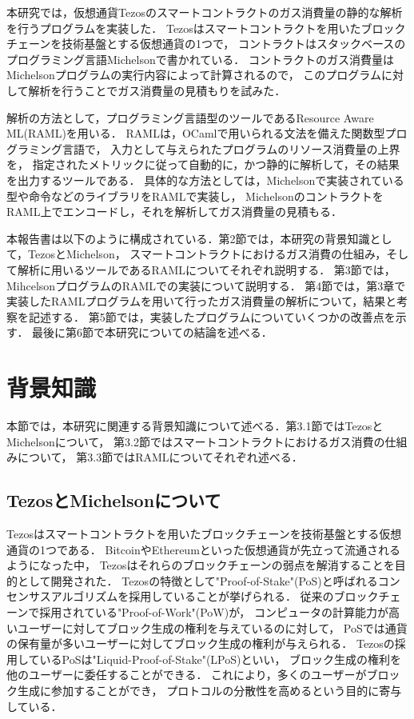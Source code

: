 \documentclass{kuisthesis}
\begin{document}
本研究では，仮想通貨Tezosのスマートコントラクトのガス消費量の静的な解析を行うプログラムを実装した．
Tezosはスマートコントラクトを用いたブロックチェーンを技術基盤とする仮想通貨の1つで，
コントラクトはスタックベースのプログラミング言語Michelsonで書かれている．
コントラクトのガス消費量はMichelsonプログラムの実行内容によって計算されるので，
このプログラムに対して解析を行うことでガス消費量の見積もりを試みた．

解析の方法として，プログラミング言語型のツールであるResource Aware ML(RAML)を用いる．
RAMLは，OCamlで用いられる文法を備えた関数型プログラミング言語で，
入力として与えられたプログラムのリソース消費量の上界を，
指定されたメトリックに従って自動的に，かつ静的に解析して，その結果を出力するツールである．
具体的な方法としては，Michelsonで実装されている型や命令などのライブラリをRAMLで実装し，
MichelsonのコントラクトをRAML上でエンコードし，それを解析してガス消費量の見積もる．

本報告書は以下のように構成されている．第2節では，本研究の背景知識として，TezosとMichelson，
スマートコントラクトにおけるガス消費の仕組み，そして解析に用いるツールであるRAMLについてそれぞれ説明する．
第3節では，MihcelsonプログラムのRAMLでの実装について説明する．
第4節では，第3章で実装したRAMLプログラムを用いて行ったガス消費量の解析について，結果と考察を記述する．
第5節では，実装したプログラムについていくつかの改善点を示す．
最後に第6節で本研究についての結論を述べる．


\section{背景知識}\label{sec-preliminary}
本節では，本研究に関連する背景知識について述べる．第3.1節ではTezosとMichelsonについて，
第3.2節ではスマートコントラクトにおけるガス消費の仕組みについて，
第3.3節ではRAMLについてそれぞれ述べる．

\subsection{TezosとMichelsonについて}\label{subsec-pre-tezos}
Tezosはスマートコントラクトを用いたブロックチェーンを技術基盤とする仮想通貨の1つである．
BitcoinやEthereumといった仮想通貨が先立って流通されるようになった中，
Tezosはそれらのブロックチェーンの弱点を解消することを目的として開発された．
Tezosの特徴として"Proof-of-Stake"(PoS)と呼ばれるコンセンサスアルゴリズムを採用していることが挙げられる．
従来のブロックチェーンで採用されている"Proof-of-Work"(PoW)が，
コンピュータの計算能力が高いユーザーに対してブロック生成の権利を与えているのに対して，
PoSでは通貨の保有量が多いユーザーに対してブロック生成の権利が与えられる．
Tezosの採用しているPoSは"Liquid-Proof-of-Stake"(LPoS)といい，
ブロック生成の権利を他のユーザーに委任することができる．
これにより，多くのユーザーがブロック生成に参加することができ，
プロトコルの分散性を高めるという目的に寄与している．
\end{document}
